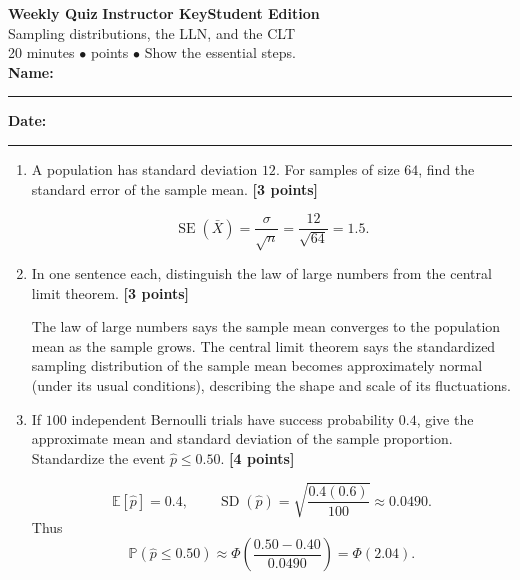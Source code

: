\documentclass[11pt]{article}
\newcounter{quiznum}
\newcommand{\E}{\mathbb E}
\newcommand{\Prob}{\mathbb P}
\newcommand{\edition}{\ifanswers Instructor Key\else Student Edition\fi}
\newcommand{\points}[1]{\hfill{\small\color{rose}\textbf{[#1 points]}}}
\newcommand{\quizheading}[1]{%
  \clearpage\stepcounter{quiznum}%
  \begin{tcolorbox}[
    enhanced,colback=paper,colframe=indigo,boxrule=1.1pt,arc=2mm,
    left=4mm,right=4mm,top=2.5mm,bottom=2.5mm,
    borderline west={4pt}{0pt}{violet}]
    {\Large\bfseries\color{indigo}Weekly Quiz \thequiznum}\hfill
    {\bfseries\color{violet}\edition}\\[-1pt]
    {\large\color{ink}#1}\\[2pt]
    {\small\color{muted}20 minutes \quad $\bullet$ \quad 10 points \quad $\bullet$ \quad Show the essential steps.}
    \ifanswers\else
      \\[5pt]\textbf{Name:}\ \rule{0.48\linewidth}{0.4pt}\hfill
      \textbf{Date:}\ \rule{0.20\linewidth}{0.4pt}
    \fi
  \end{tcolorbox}
}
\begin{document}
\quizheading{Sampling distributions, the LLN, and the CLT}
\begin{enumerate}
  \item A population has standard deviation $12$. For samples of size $64$, find
  the standard error of the sample mean. \points{3}
  \begin{solution}[1.0in]
    \[
      \operatorname{SE}(\bar X)=\frac{\sigma}{\sqrt n}
      =\frac{12}{\sqrt{64}}=1.5.
    \]
  \end{solution}

  \item In one sentence each, distinguish the law of large numbers from the central
  limit theorem. \points{3}
  \begin{solution}[1.4in]
    The law of large numbers says the sample mean converges to the population mean
    as the sample grows. The central limit theorem says the standardized sampling
    distribution of the sample mean becomes approximately normal (under its usual
    conditions), describing the shape and scale of its fluctuations.
  \end{solution}

  \item If $100$ independent Bernoulli trials have success probability $0.4$, give
  the approximate mean and standard deviation of the sample proportion. Standardize
  the event $\hat p\le0.50$. \points{4}
  \begin{solution}[1.5in]
    \[
      \E[\hat p]=0.4,\qquad
      \operatorname{SD}(\hat p)=\sqrt{\frac{0.4(0.6)}{100}}\approx0.0490.
    \]
    Thus
    \[
      \Prob(\hat p\le0.50)\approx
      \Phi\left(\frac{0.50-0.40}{0.0490}\right)=\Phi(2.04).
    \]
  \end{solution}
\end{enumerate}
\end{document}
